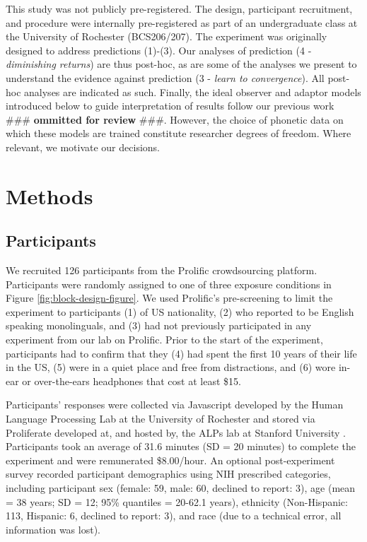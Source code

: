 \documentclass[
  11pt,
  man,mask,floatsintext]{apa6}
\begin{document}
This study was not publicly pre-registered. The design, participant recruitment, and procedure were internally pre-registered as part of an undergraduate class at the University of Rochester (BCS206/207). The experiment was originally designed to address predictions (1)-(3). Our analyses of prediction (4 - \emph{diminishing returns}) are thus post-hoc, as are some of the analyses we present to understand the evidence against prediction (3 - \emph{learn to convergence}). All post-hoc analyses are indicated as such. Finally, the ideal observer and adaptor models introduced below to guide interpretation of results follow our previous work \#\#\# \textbf{ommitted for review} \#\#\#. However, the choice of phonetic data on which these models are trained constitute researcher degrees of freedom. Where relevant, we motivate our decisions.

\section{Methods}\label{methods}

\subsection{Participants}\label{participants}

We recruited 126 participants from the Prolific crowdsourcing platform. Participants were randomly assigned to one of three exposure conditions in Figure \ref{fig:block-design-figure}. We used Prolific's pre-screening to limit the experiment to participants (1) of US nationality, (2) who reported to be English speaking monolinguals, and (3) had not previously participated in any experiment from our lab on Prolific. Prior to the start of the experiment, participants had to confirm that they (4) had spent the first 10 years of their life in the US, (5) were in a quiet place and free from distractions, and (6) wore in-ear or over-the-ears headphones that cost at least \$15.

Participants' responses were collected via Javascript developed by the Human Language Processing Lab at the University of Rochester \autocite{JSEXP2021} and stored via Proliferate developed at, and hosted by, the ALPs lab at Stanford University \autocite{Proliferate}. Participants took an average of 31.6 minutes (SD = 20 minutes) to complete the experiment and were remunerated \$8.00/hour. An optional post-experiment survey recorded participant demographics using NIH prescribed categories, including participant sex (female: 59, male: 60, declined to report: 3), age (mean = 38 years; SD = 12; 95\% quantiles = 20-62.1 years), ethnicity (Non-Hispanic: 113, Hispanic: 6, declined to report: 3), and race (due to a technical error, all information was lost).
\end{document}
